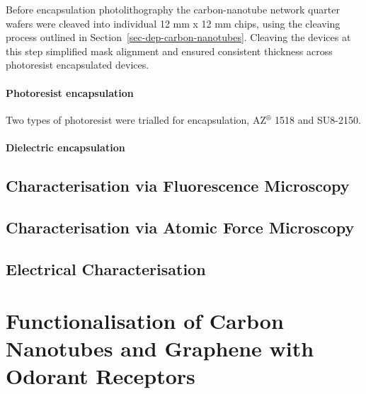\documentclass[
  a4paper,
]{scrbook}
\begin{document}
Before encapsulation photolithography the carbon-nanotube network
quarter wafers were cleaved into individual 12 mm x 12 mm chips, using
the cleaving process outlined in Section~\ref{sec-dep-carbon-nanotubes}.
Cleaving the devices at this step simplified mask alignment and ensured
consistent thickness across photoresist encapsulated devices.

\hypertarget{photoresist-encapsulation}{%
\subsubsection*{Photoresist
encapsulation}\label{photoresist-encapsulation}}

Two types of photoresist were trialled for encapsulation,
AZ\(^\circledR\) 1518 and SU8-2150.

\hypertarget{dielectric-encapsulation}{%
\subsubsection*{Dielectric
encapsulation}\label{dielectric-encapsulation}}

\hypertarget{sec-fluorescence-characterisation}{%
\section{Characterisation via Fluorescence
Microscopy}\label{sec-fluorescence-characterisation}}

\hypertarget{sec-AFM-characterisation}{%
\section{Characterisation via Atomic Force
Microscopy}\label{sec-AFM-characterisation}}

\hypertarget{sec-electrical-characterisation}{%
\section{Electrical
Characterisation}\label{sec-electrical-characterisation}}


\hypertarget{functionalisation-of-carbon-nanotubes-and-graphene-with-odorant-receptors}{%
\chapter{Functionalisation of Carbon Nanotubes and Graphene with Odorant
Receptors}\label{functionalisation-of-carbon-nanotubes-and-graphene-with-odorant-receptors}}
\end{document}

